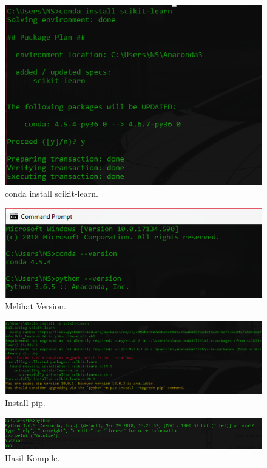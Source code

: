 \begin{enumerate}
\begin{figure}[ht]
\centerline{\includegraphics[width=1\textwidth]{figures/32.PNG}}
\caption{conda install scikit-learn.}
\label{gambarYN1}
\end{figure}

\begin{figure}[ht]
\centerline{\includegraphics[width=1\textwidth]{figures/31.PNG}}
\caption{Melihat Version.}
\label{gambarYN2}
\end{figure}

\begin{figure}[ht]
\centerline{\includegraphics[width=1\textwidth]{figures/33.PNG}}
\caption{Install pip.}
\label{gambarYN3}
\end{figure}

\begin{figure}[ht]
\centerline{\includegraphics[width=1\textwidth]{figures/35.PNG}}
\caption{Hasil Kompile.}
\label{gambarYN4}
\end{figure}


\end{enumerate}
